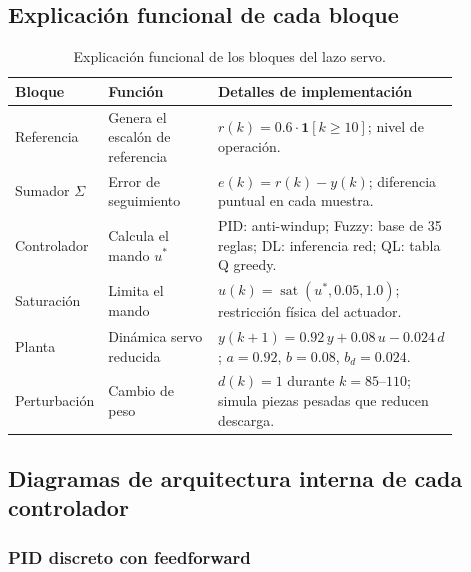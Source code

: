     


\subsection*{Explicación funcional de cada bloque}

\begin{longtable}{@{}P{0.18\linewidth}P{0.28\linewidth}P{0.42\linewidth}@{}}
\caption{Explicación funcional de los bloques del lazo servo.}
\label{tab:bloques_servo}\\
\toprule
Bloque & Función & Detalles de implementación \\ \midrule
Referencia & Genera el escalón de referencia & $r(k) = 0.6\cdot\mathbf{1}[k \geq 10]$; nivel de operación.\\
Sumador $\Sigma$ & Error de seguimiento & $e(k) = r(k) - y(k)$; diferencia puntual en cada muestra.\\
Controlador & Calcula el mando $u^*$ & PID: anti-windup; Fuzzy: base de 35 reglas; DL: inferencia red; QL: tabla Q greedy.\\
Saturación & Limita el mando & $u(k) = \operatorname{sat}(u^*, 0.05, 1.0)$; restricción física del actuador.\\
Planta & Dinámica servo reducida & $y(k{+}1) = 0.92\,y + 0.08\,u - 0.024\,d$; $a=0.92$, $b=0.08$, $b_d=0.024$.\\
Perturbación & Cambio de peso & $d(k)=1$ durante $k=85$--$110$; simula piezas pesadas que reducen descarga.\\
\bottomrule
\end{longtable}

\subsection*{Diagramas de arquitectura interna de cada controlador}

\subsubsection*{PID discreto con feedforward}

